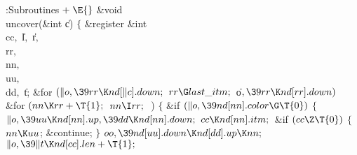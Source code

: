 \Y\B\4:Subroutines\X${}\mathrel+\E{}$\6
\1\1\&{void} \\{uncover}(\&{int} \|c)\2\2\6
${}\{{}$\1\6
\&{register} \&{int} \\{cc}${},{}$ \|l${},{}$ \|r${},{}$ \\{rr}${},{}$ %
\\{nn}${},{}$ \\{uu}${},{}$ \\{dd}${},{}$ \|t;\7
\&{for} ${}(\|o,\39\\{rr}\K\\{nd}[\|c].\\{down};{}$ ${}\\{rr}\G\\{last%
\_itm};{}$ \|o${},\39\\{rr}\K\\{nd}[\\{rr}].\\{down}){}$\1\6
\&{for} ${}(\\{nn}\K\\{rr}+\T{1};{}$ ${}\\{nn}\I\\{rr};{}$ \,)\5
${}\{{}$\1\6
\&{if} ${}(\|o,\39\\{nd}[\\{nn}].\\{color}\G\T{0}){}$\5
${}\{{}$\1\6
${}\|o,\39\\{uu}\K\\{nd}[\\{nn}].\\{up},\39\\{dd}\K\\{nd}[\\{nn}].\\{down};{}$\6
${}\\{cc}\K\\{nd}[\\{nn}].\\{itm};{}$\6
\&{if} ${}(\\{cc}\Z\T{0}){}$\5
${}\{{}$\1\6
${}\\{nn}\K\\{uu}{}$;\5
\&{continue};\6
\4${}\}{}$\2\6
${}\\{oo},\39\\{nd}[\\{uu}].\\{down}\K\\{nd}[\\{dd}].\\{up}\K\\{nn};{}$\6
${}\|o,\39\|t\K\\{nd}[\\{cc}].\\{len}+\T{1};{}$\6
